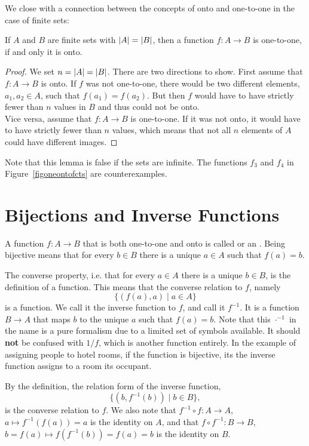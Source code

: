 We close with a connection between the concepts of onto and one-to-one in
the case of finite sets:
\begin{lemma}
\label{lemoneonto}
If $A$ and $B$ are finite sets with $\left|A\right|=\left|B\right|$, then a function $f\colon A\to B$ is
one-to-one, if and only it is onto.
\end{lemma}
\begin{proof}
We set $n=\left|A\right|=\left|B\right|$.
There are two directions to show. First assume that $f\colon A\to B$ is onto. If $f$ was
not one-to-one, there would be two different elements, $a_1,a_2\in A$, such that
$f(a_1)=f(a_2)$. But then $f$ would have to have strictly fewer than $n$ values in $B$
and thus could not be onto.\\
Vice versa, assume that $f\colon A\to B$ is one-to-one. If it was not onto, it would
have to have strictly fewer than $n$ values, which means that not all $n$ elements of
$A$ could have different images.
\end{proof}
Note that this lemma is false if the sets are infinite. The functions $f_3$ and $f_4$ in
Figure~\ref{figoneontofcts} are counterexamples.

\section{Bijections and Inverse Functions}

A function $f\colon A\to B$ that is both one-to-one and onto is called
 or an . Being bijective means that for every $b\in
B$ there is a unique $a\in A$ such that $f(a)=b$.

The converse property, i.e. that for every
$a\in A$ there is a unique $b\in B$, is the definition of a function. This means that
the converse relation to $f$, namely
\[
\{(f(a),a)\mid a\in A\}
\]
is a function. We call it the inverse function to $f$, and call it $f^{-1}$. It is a
function $B\to A$ that maps $b$ to the unique $a$ such that $f(a)=b$.
Note that
this $\cdot^{-1}$ in the name is a pure formalism due to a limited set of symbols available. It
should \textbf{not} be confused with $1/f$, which is another function entirely.
In the example of assigning people to hotel rooms, if the function is bijective, its the
inverse function assigns to a room its occupant.

By the definition, the relation form of the inverse function,
\[
\{(b,f^{-1}(b))\mid b\in B\},
\]
is the converse relation to $f$. We also
note that $f^{-1}\circ f\colon A\to A$, $a\mapsto f^{-1}(f(a))=a$ is the identity
on $A$, and that $f\circ f^{-1}\colon B\to B$, $b=f(a)\mapsto f(f^{-1}(b))=f(a)=b$ is
the identity on $B$.
\medskip

